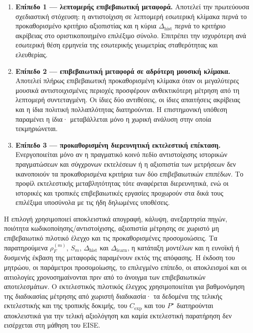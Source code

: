\documentclass[11pt,a4paper]{article}
\begin{document}
\begin{enumerate}
\item \textbf{Επίπεδο 1 --- λεπτομερής επιβεβαιωτική μεταφορά.} Αποτελεί την πρωτεύουσα σχεδιαστική στόχευση: η αντιστοίχιση σε λεπτομερή εσωτερική κλίμακα περνά το προκαθορισμένο κριτήριο αξιοπιστίας και η κύρια $\Delta_{\mathrm{hist}}$ περνά το κριτήριο ακρίβειας στο οριστικοποιημένο επιλέξιμο σύνολο. Επιτρέπει την ισχυρότερη ανά εσωτερική θέση ερμηνεία της εσωτερικής γεωμετρίας σταθερότητας και ελευθερίας.
\item \textbf{Επίπεδο 2 --- επιβεβαιωτική μεταφορά σε αδρότερη μουσική κλίμακα.} Αποτελεί πλήρως επιβεβαιωτική προκαθορισμένη κλίμακα όταν οι μεγαλύτερες μουσικά αντιστοιχισμένες περιοχές προσφέρουν ανθεκτικότερη μέτρηση από τη λεπτομερή συντεταγμένη. Οι ίδιες δύο αντιθέσεις, οι ίδιες απαιτήσεις ακρίβειας και η ίδια πολιτική πολλαπλότητας διατηρούνται. Η επιστημονική υπόθεση παραμένει η ίδια· μεταβάλλεται μόνο η χωρική ανάλυση στην οποία τεκμηριώνεται.
\item \textbf{Επίπεδο 3 --- προκαθορισμένη διερευνητική εκτελεστική επέκταση.} Ενεργοποιείται μόνο αν η πραγματικό κοινό πεδίο αντιστοίχισης ιστορικών πραγματώσεων και σύγχρονων εκτελέσεων ή η αξιοπιστία των μετρήσεων δεν ικανοποιούν τα προκαθορισμένα κριτήρια των δύο επιβεβαιωτικών επιπέδων. Το προφίλ εκτελεστικής μεταβλητότητας τότε αναφέρεται διερευνητικά, ενώ οι ιστορικές και τροπικές επιβεβαιωτικές εργασίες προχωρούν στα δικά τους επιλέξιμα υποσύνολα με τις ήδη δηλωμένες υποθέσεις.
\end{enumerate}

Η επιλογή χρησιμοποιεί αποκλειστικά απογραφή, κάλυψη, ανεξαρτησία πηγών, ποιότητα κωδικοποίησης/αντιστοίχισης, αξιοπιστία μέτρησης σε χωριστό μη επιβεβαιωτικό πιλοτικό έλεγχο και τις προκαθορισμένες προσομοιώσεις. Τα παρατηρούμενα $\rho_F^{(m)}$, $S_m$, $\Delta_{\mathrm{hist}}$ και $\Delta_{\mathrm{learn}}$, η κατάταξη μοντέλων και η ευνοϊκή ή δυσμενής έκβαση της μεταφοράς παραμένουν εκτός της απόφασης. Η έκδοση του μητρώου, οι παράμετροι προσομοίωσης, το επιλεγμένο επίπεδο, οι αποκλεισμοί και οι αιτιολογίες χρονοσημαίνονται πριν από το άνοιγμα των επιβεβαιωτικών αποτελεσμάτων. Ο εκτελεστικός πιλοτικός έλεγχος χρησιμοποιείται για βαθμονόμηση της διαδικασίας μέτρησης από χωριστή διαδικασία· τα δεδομένα της τελικής εκτελεστικής και της τροπικής δοκιμής, του $C_{\mathrm{exp}}$ και του $P^\star$ διατηρούνται αποκλειστικά για την τελική αξιολόγηση και καμία εκτελεστική παρατήρηση δεν εισέρχεται στη μάθηση του EISE.
\end{document}
